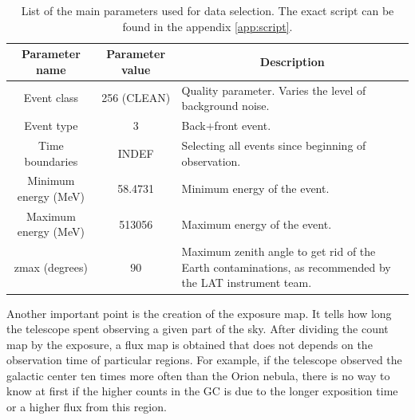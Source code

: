 \begin{center}
\begin{table}[h]
\centering
\begin{tabular}{|c|c|p{6.5cm}|}
\hline
\multicolumn{1}{|c|}{\textbf{Parameter name}} & \textbf{Parameter value} & \multicolumn{1}{c|}{\textbf{Description}}                                                                   \\ \hline
Event class                         & 256 (CLEAN)              & Quality parameter. Varies the level of background noise.                                                    \\ \hline
Event type                          & 3                        & Back+front event.                                                                                           \\ \hline
Time boundaries                     & INDEF                    & Selecting all events since beginning of observation.                                                        \\ \hline
Minimum energy (MeV)                & 58.4731                  & Minimum energy of the event.                                                                                \\ \hline
Maximum energy (MeV)                & 513056                   & Maximum energy of the event.                                                                                \\ \hline
zmax (degrees)                      & 90                       & Maximum zenith angle to get rid of the Earth contaminations, as recommended by the LAT instrument team. \\ \hline
\end{tabular}
\caption[Main parameter for Fermi data selection.]{List of the main parameters used for data selection. The exact script can be found in the appendix \ref{app:script}.}
\label{tab:fermi_selection_parameters}
\end{table}
\end{center}


Another important point is the creation of the exposure map. It tells how long the telescope spent observing a given part of the sky. After dividing the count map by the exposure, a flux map is obtained that does not depends on the observation time of particular regions. For example, if the telescope observed the galactic center ten times more often than the Orion nebula, there is no way to know at first if the higher counts in the GC is due to the longer exposition time or a higher flux from this region.

